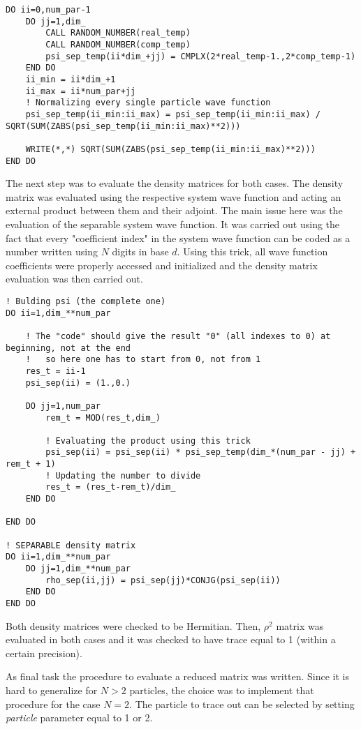 \documentclass[12pt, a4paper, notitlepage]{report}
\begin{document}
\begin{lstlisting}
DO ii=0,num_par-1
	DO jj=1,dim_
		CALL RANDOM_NUMBER(real_temp)
		CALL RANDOM_NUMBER(comp_temp)
		psi_sep_temp(ii*dim_+jj) = CMPLX(2*real_temp-1.,2*comp_temp-1)
	END DO
	ii_min = ii*dim_+1
	ii_max = ii*num_par+jj
	! Normalizing every single particle wave function
	psi_sep_temp(ii_min:ii_max) = psi_sep_temp(ii_min:ii_max) / SQRT(SUM(ZABS(psi_sep_temp(ii_min:ii_max)**2)))
	
	WRITE(*,*) SQRT(SUM(ZABS(psi_sep_temp(ii_min:ii_max)**2)))
END DO
\end{lstlisting}

The next step was to evaluate the density matrices for both cases. The density matrix was evaluated using the respective system wave function and acting an external product between them and their adjoint. The main issue here was the evaluation of the separable system wave function. It was carried out using the fact that every "coefficient index" in the system wave function can be coded as a number written using $N$ digits in base $d$. Using this trick, all wave function coefficients were properly accessed and initialized and the density matrix evaluation was then carried out.

\begin{lstlisting}
! Bulding psi (the complete one)
DO ii=1,dim_**num_par

	! The "code" should give the result "0" (all indexes to 0) at beginning, not at the end
	!	so here one has to start from 0, not from 1
	res_t = ii-1
	psi_sep(ii) = (1.,0.)
	
	DO jj=1,num_par
		rem_t = MOD(res_t,dim_)
		
		! Evaluating the product using this trick
		psi_sep(ii) = psi_sep(ii) * psi_sep_temp(dim_*(num_par - jj) + rem_t + 1)
		! Updating the number to divide
		res_t = (res_t-rem_t)/dim_
	END DO
	
END DO

! SEPARABLE density matrix
DO ii=1,dim_**num_par
	DO jj=1,dim_**num_par
		rho_sep(ii,jj) = psi_sep(jj)*CONJG(psi_sep(ii))
	END DO
END DO
\end{lstlisting}

Both density matrices were checked to be Hermitian. Then, $\rho^2$ matrix was evaluated in both cases and it was checked to have trace equal to 1 (within a certain precision).

As final task the procedure to evaluate a reduced matrix was written. Since it is hard to generalize for $N > 2$ particles, the choice was to implement that procedure for the case $N=2$. The particle to trace out can be selected by setting \textit{particle} parameter equal to 1 or 2.
\end{document}
